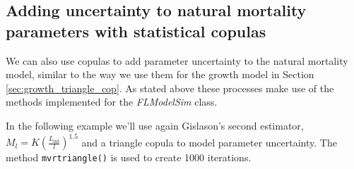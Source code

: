 \documentclass[a4paper,english,10pt]{article}\usepackage[]{graphicx}\usepackage[]{color}
\newcommand{\code}[1]{{\texttt{#1}}}
\newcommand{\class}[1]{{\textit{#1}}}
\begin{document}
\subsection{Adding uncertainty to natural mortality parameters with statistical copulas}

We can also use copulas to add parameter uncertainty to the natural mortality model, similar to the way we use them for the growth model in Section \ref{sec:growth_triangle_cop}. As stated above these processes make use of the methods implemented for the \class{FLModelSim} class.


In the following example we'll use again Gislason's second estimator, $M_l=K(\frac{L_{\inf}}{l})^{1.5}$ and a triangle copula to model parameter uncertainty. The method \code{mvrtriangle()} is used to create 1000 iterations.
\end{document}
